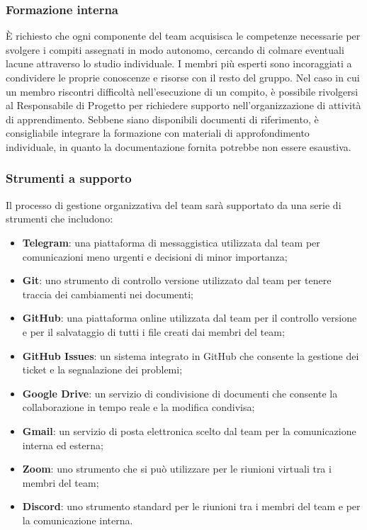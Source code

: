 \subsubsection{Formazione interna}
È richiesto che ogni componente del team acquisisca le competenze necessarie per svolgere i compiti assegnati in modo autonomo, cercando di colmare eventuali lacune attraverso lo studio individuale. I membri più esperti sono incoraggiati a condividere le proprie conoscenze e risorse con il resto del gruppo. Nel caso in cui un membro riscontri difficoltà nell'esecuzione di un compito, è possibile rivolgersi al Responsabile di Progetto per richiedere supporto nell'organizzazione di attività di apprendimento. Sebbene siano disponibili documenti di riferimento, è consigliabile integrare la formazione con materiali di approfondimento individuale, in quanto la documentazione fornita potrebbe non essere esaustiva.

\subsubsection{Strumenti a supporto}
Il processo di gestione organizzativa del team sarà supportato da una serie di strumenti che includono:
\begin{itemize}
    \item \textbf{Telegram}: una piattaforma di messaggistica utilizzata dal team per comunicazioni meno urgenti e decisioni di minor importanza;
    \item \textbf{Git}: uno strumento di controllo versione utilizzato dal team per tenere traccia dei cambiamenti nei documenti;
    \item \textbf{GitHub}: una piattaforma online utilizzata dal team per il controllo versione e per il salvataggio di tutti i file creati dai membri del team;
    \item \textbf{GitHub Issues}: un sistema integrato in GitHub che consente la gestione dei ticket e la segnalazione dei problemi;
    \item \textbf{Google Drive}: un servizio di condivisione di documenti che consente la collaborazione in tempo reale e la modifica condivisa;
    \item \textbf{Gmail}: un servizio di posta elettronica scelto dal team per la comunicazione interna ed esterna;
    \item \textbf{Zoom}: uno strumento che si può utilizzare per le riunioni virtuali tra i membri del team;
    \item \textbf{Discord}: uno strumento standard per le riunioni tra i membri del team e per la comunicazione interna.
\end{itemize}
